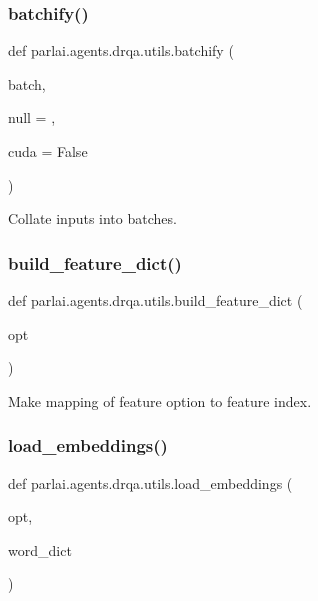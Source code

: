 \subsubsection{\texorpdfstring{batchify()}{batchify()}}
{\footnotesize\ttfamily def parlai.\+agents.\+drqa.\+utils.\+batchify (\begin{DoxyParamCaption}\item[{}]{batch,  }\item[{}]{null = {},  }\item[{}]{cuda = {\ttfamily False} }\end{DoxyParamCaption})}

\begin{DoxyVerb}Collate inputs into batches.
\end{DoxyVerb}
 \mbox{\label{namespaceparlai_1_1agents_1_1drqa_1_1utils_a14201349d4a16b48aa7929cfdbf10ebd}} 
\subsubsection{\texorpdfstring{build\+\_\+feature\+\_\+dict()}{build\_feature\_dict()}}
{\footnotesize\ttfamily def parlai.\+agents.\+drqa.\+utils.\+build\+\_\+feature\+\_\+dict (\begin{DoxyParamCaption}\item[{}]{opt }\end{DoxyParamCaption})}

\begin{DoxyVerb}Make mapping of feature option to feature index.
\end{DoxyVerb}
 \mbox{\label{namespaceparlai_1_1agents_1_1drqa_1_1utils_aa92d9906125210574825a20c75c199c8}} 
\subsubsection{\texorpdfstring{load\+\_\+embeddings()}{load\_embeddings()}}
{\footnotesize\ttfamily def parlai.\+agents.\+drqa.\+utils.\+load\+\_\+embeddings (\begin{DoxyParamCaption}\item[{}]{opt,  }\item[{}]{word\+\_\+dict }\end{DoxyParamCaption})}

